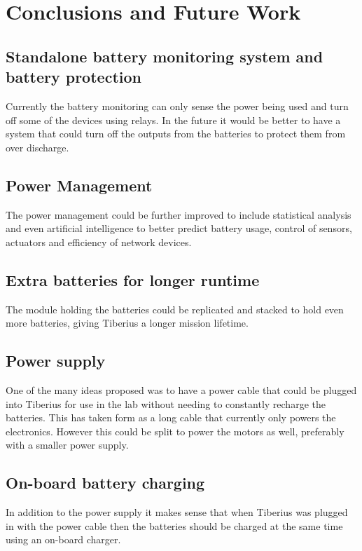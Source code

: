 \section{Conclusions and Future Work}

\subsection{Standalone battery monitoring system and battery protection}
Currently the battery monitoring can only sense the power being used and turn off some of the devices using relays. In the future it would be better to have a system that could turn off the outputs from the batteries to protect them from over discharge.

\subsection{Power Management} The power management could be further improved to include statistical analysis and even artificial intelligence to better predict battery usage, control of sensors, actuators and efficiency of network devices.

\subsection{Extra batteries for longer runtime}
The module holding the batteries could be replicated and stacked to hold even more batteries, giving Tiberius a longer mission lifetime.

\subsection{Power supply}
One of the many ideas proposed was to have a power cable that could be plugged into Tiberius for use in the lab without needing to constantly recharge the batteries. This has taken form as a long cable that currently only powers the electronics. However this could be split to power the motors as well, preferably with a smaller power supply.

\subsection{On-board battery charging}
In addition to the power supply it makes sense that when Tiberius was plugged in with the power cable then the batteries should be charged at the same time using an on-board charger.